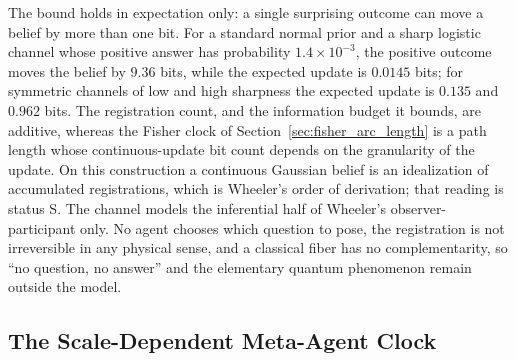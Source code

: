 The bound holds in expectation only: a single surprising outcome can move a belief by more than one bit. For a standard normal prior and a sharp logistic channel whose positive answer has probability $1.4\times10^{-3}$, the positive outcome moves the belief by $9.36$ bits, while the expected update is $0.0145$ bits; for symmetric channels of low and high sharpness the expected update is $0.135$ and $0.962$ bits. The registration count, and the information budget it bounds, are additive, whereas the Fisher clock of Section~\ref{sec:fisher_arc_length} is a path length whose continuous-update bit count depends on the granularity of the update. On this construction a continuous Gaussian belief is an idealization of accumulated registrations, which is Wheeler's order of derivation; that reading is status S. The channel models the inferential half of Wheeler's observer-participant only. No agent chooses which question to pose, the registration is not irreversible in any physical sense, and a classical fiber has no complementarity, so ``no question, no answer'' and the elementary quantum phenomenon remain outside the model.

\subsection{The Scale-Dependent Meta-Agent Clock}
\label{sec:scale_dependent_time}

